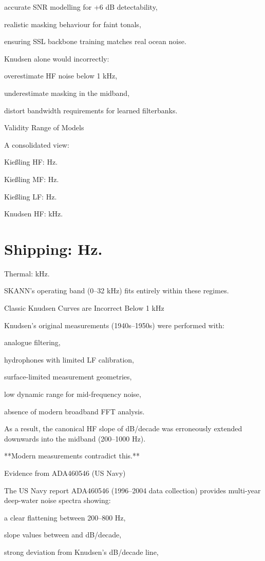 \documentclass[12pt]{article}
\begin{document}
accurate SNR modelling for +6 dB detectability,

realistic masking behaviour for faint tonals,

ensuring SSL backbone training matches real ocean noise.

Knudsen alone would incorrectly:

overestimate HF noise below 1 kHz,

underestimate masking in the midband,

distort bandwidth requirements for learned filterbanks.

Validity Range of Models

A consolidated view:

Kießling HF:  Hz.

Kießling MF:  Hz.

Kießling LF:  Hz.

Knudsen HF:  kHz.

\section*{Shipping:  Hz.}
Thermal:  kHz.

SKANN’s operating band (0–32 kHz) fits entirely within these regimes.

Classic Knudsen Curves are Incorrect Below 1 kHz

Knudsen’s original measurements (1940s–1950s) were performed with:

analogue filtering,

hydrophones with limited LF calibration,

surface-limited measurement geometries,

low dynamic range for mid-frequency noise,

absence of modern broadband FFT analysis.

As a result, the canonical HF slope of  dB/decade was erroneously extended downwards into the midband (200–1000 Hz).

**Modern measurements contradict this.**

Evidence from ADA460546 (US Navy)

The US Navy report ADA460546 (1996–2004 data collection) provides multi-year deep-water noise spectra showing:

a clear flattening between 200–800 Hz,

slope values between  and  dB/decade,

strong deviation from Knudsen’s  dB/decade line,
\end{document}
